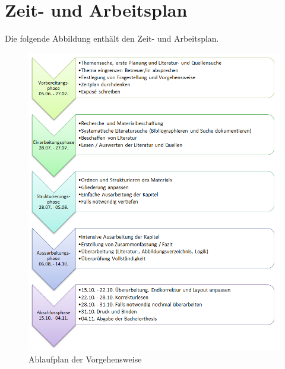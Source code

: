 
\chapter{Zeit- und Arbeitsplan}
\label{ch:Zeitplan}

 
Die folgende Abbildung enthält den Zeit- und Arbeitsplan.

\begin{figure}[H]
 \centering
 \includegraphics[scale=0.7]{images/Ablaufplan_BA.png}
 \caption{Ablaufplan der Vorgehensweise \cite{fig:Ablaufplan}}
 \label{fig:Ablaufplan}
\end{figure}

